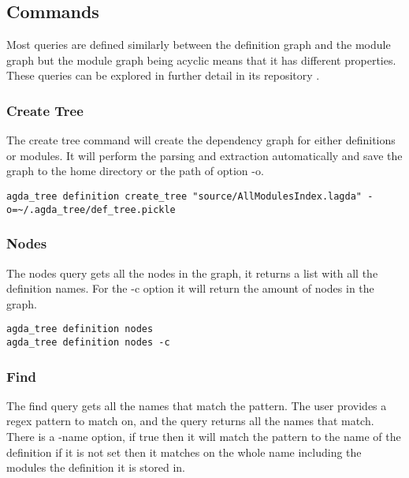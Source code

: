 
\subsection{Commands}

Most queries are defined similarly between the definition graph and the module
graph but the module graph being acyclic means that it has different
properties. These queries can be explored in further detail in its repository
\cite{agda_html}.

\subsubsection{Create Tree}

The create tree command will create the dependency graph for either definitions
or modules. It will perform the parsing and extraction automatically and save
the graph to the home directory or the path of option -o.

\begin{lstlisting}
agda_tree definition create_tree "source/AllModulesIndex.lagda" -o=~/.agda_tree/def_tree.pickle
\end{lstlisting}

\subsubsection{Nodes}

The nodes query gets all the nodes in the graph, it returns a list with all the
definition names. For the \textsf{-c} option it will return the amount of nodes
in the graph. 

\begin{lstlisting}
agda_tree definition nodes
agda_tree definition nodes -c
\end{lstlisting}

\subsubsection{Find}

The find query gets all the names that match the pattern. The user provides a
regex pattern to match on, and the query returns all the names that match.
There is a -name option, if true then it will match the pattern to the name of
the definition if it is not set then it matches on the whole name including the
modules the definition it is stored in.

